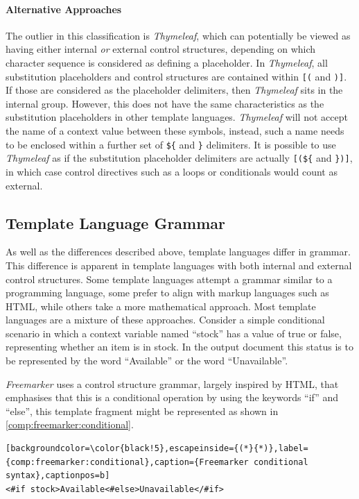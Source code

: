 \paragraph{Alternative Approaches} The outlier in this classification is \emph{Thymeleaf}, which can potentially be viewed as having either internal \emph{or} external control structures, depending on which character sequence is considered as defining a placeholder. In \emph{Thymeleaf}, all substitution  placeholders and control structures are contained within \verb![(! and \verb!)]!. If those are considered as the placeholder delimiters, then \emph{Thymeleaf} sits in the internal group. However, this does not have the same characteristics as the substitution placeholders in other \gls{template language}s. \emph{Thymeleaf} will not accept the name of a context value between these symbols, instead, such a name needs to be enclosed within a further set of \verb!${! and \verb!}! delimiters. It is possible to use \emph{Thymeleaf} as if the substitution placeholder delimiters are actually \verb![(${! and \verb!})]!, in which case control directives such as a loops or conditionals would count as external.

\subsection{Template Language Grammar}
\label{comp:grammar}

As well as the differences described above, \gls{template language}s differ in grammar. This difference is apparent in \gls{template language}s with both internal and external control structures. Some \gls{template language}s attempt a grammar similar to a \gls{programming language}, some prefer to align with markup languages such as HTML, while others take a more mathematical approach. Most \gls{template language}s are a mixture of these approaches. Consider a simple conditional scenario in which a context variable named \enquote{stock} has a value of true or false, representing whether an item is in stock. In the output document this status is to be represented by the word \enquote{Available} or the word \enquote{Unavailable}.

\emph{Freemarker} uses a control structure grammar, largely inspired by HTML, that emphasises that this is a conditional operation by using the keywords \enquote{if} and \enquote{else}, this template fragment might be represented as shown in \autoref{comp:freemarker:conditional}.

\begin{lstlisting}[backgroundcolor=\color{black!5},escapeinside={(*}{*)},label={comp:freemarker:conditional},caption={Freemarker conditional syntax},captionpos=b]
<#if stock>Available<#else>Unavailable</#if>
\end{lstlisting}

